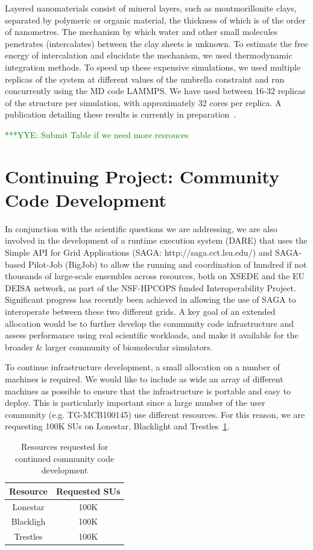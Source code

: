 \documentclass[a4paper,10pt]{article}
\newcommand{\up}{\vspace*{-1em}}
\newcommand{\yyenote}[1]{ {\textcolor{green} { ***YYE: #1 }}}
\newcommand{\yyenote}[1]{ {}}
\begin{document}
Layered nanomaterials consist of mineral layers, such as montmorillonite clays, separated by polymeric or organic material, the thickness of which is of the order of nanometres. The mechanism by which water and other small molecules penetrates (intercalates) between the clay sheets is unknown. To estimate the free energy of intercalation and elucidate the mechanism, we used thermodynamic integration methods. To speed up these expensive simulations, we used multiple replicas of the system at different values of the umbrella constraint and run concurrently using the MD code LAMMPS. We have used between 16-32 replicas of the structure per simulation, with approximately 32 cores per replica. A publication detailing these results is currently in preparation~\cite{Ref11}.

\yyenote{Submit Table if we need more resrouces}


\section{Continuing Project: Community Code Development}
In conjunction with the scientific questions we are addressing, we are also involved in the development of a runtime execution system (DARE) that uses the Simple API for Grid Applications (SAGA: http://saga.cct.lsu.edu/) and SAGA-based Pilot-Job (BigJob) to allow the running and coordination of hundred if not thousands of large-scale ensembles across resources, both on XSEDE and the EU DEISA network, as part of the NSF-HPCOPS funded Interoperability Project. Significant progress has recently been achieved in allowing the use of SAGA to interoperate between these two different grids.  A key goal of an extended allocation would be to further develop the community code infrastructure and assess performance using real scientific workloads, and make it available for the broader \& larger community of biomolecular simulators.

To continue infrastructure development, a small allocation on a number of machines is required. We would like to include as wide an array of different machines as possible to ensure that the infrastructure is portable and easy to deploy. This is particularly important since a large number of the user community (e.g. TG-MCB100145) use different resources. For this reason, we are requesting 100K SUs on Lonestar, Blacklight and Trestles~\ref{table:Infrastructure}.

\begin{table}[!h]
\up
\begin{center}
\begin{tabular}{|c| c | }
\hline 
Resource & Requested SUs\\ 
\hline
Lonestar  &  100K \\
\hline
Blackligh &  100K \\
\hline
Trestles  &  100K \\
\hline
\end{tabular}
\end{center}
  \caption{\small Resources requested for continued community code development}\label{table:Infrastructure}
\up
\end{table}
\end{document}
